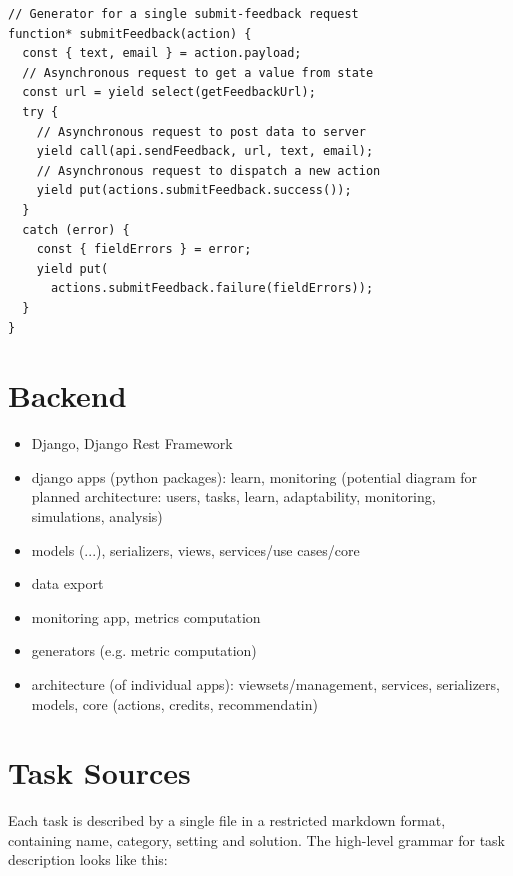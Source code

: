 
\begin{lstlisting}[language=ES6]
// Generator for a single submit-feedback request
function* submitFeedback(action) {
  const { text, email } = action.payload;
  // Asynchronous request to get a value from state
  const url = yield select(getFeedbackUrl);
  try {
    // Asynchronous request to post data to server
    yield call(api.sendFeedback, url, text, email);
    // Asynchronous request to dispatch a new action
    yield put(actions.submitFeedback.success());
  }
  catch (error) {
    const { fieldErrors } = error;
    yield put(
      actions.submitFeedback.failure(fieldErrors));
  }
}
\end{lstlisting}



\section{Backend}

\begin{itemize}
\item Django, Django Rest Framework
\item django apps (python packages): learn, monitoring (potential diagram for planned architecture: users, tasks, learn, adaptability, monitoring, simulations, analysis)
\item models (...), serializers, views, services/use cases/core
\item data export
\item monitoring app, metrics computation
\item generators (e.g. metric computation)
\item architecture (of individual apps): viewsets/management, services, serializers, models, core (actions, credits, recommendatin)
\end{itemize}


\section{Task Sources}

Each task is described by a single file in a restricted markdown format,
containing name, category, setting and solution.
The high-level grammar for task description looks like this:

